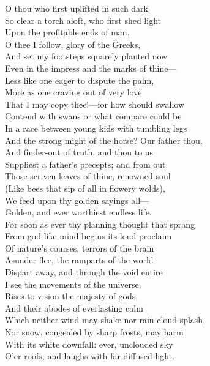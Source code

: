 

O thou who first uplifted in such dark\\
So clear a torch aloft, who first shed light\\
Upon the profitable ends of man,\\
O thee I follow, glory of the Greeks,\\
And set my footsteps squarely planted now\\
Even in the impress and the marks of thine—\\
Less like one eager to dispute the palm,\\
More as one craving out of very love\\
That I may copy thee!—for how should swallow\\
Contend with swans or what compare could be\\
In a race between young kids with tumbling legs\\
And the strong might of the horse? Our father thou,\\
And finder-out of truth, and thou to us\\
Suppliest a father's precepts; and from out\\
Those scriven leaves of thine, renowned soul\\
(Like bees that sip of all in flowery wolds),\\
We feed upon thy golden sayings all—\\
Golden, and ever worthiest endless life.\\
For soon as ever thy planning thought that sprang\\
From god-like mind begins its loud proclaim\\
Of nature's courses, terrors of the brain\\
Asunder flee, the ramparts of the world\\
Dispart away, and through the void entire\\
I see the movements of the universe.\\
Rises to vision the majesty of gods,\\
And their abodes of everlasting calm\\
Which neither wind may shake nor rain-cloud splash,\\
Nor snow, congealed by sharp frosts, may harm\\
With its white downfall: ever, unclouded sky\\
O'er roofs, and laughs with far-diffused light.\\
